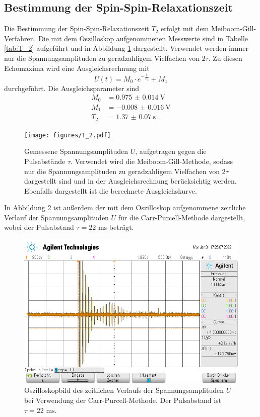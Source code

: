 \subsection*{Bestimmung der Spin-Spin-Relaxationszeit}
Die Bestimmung der Spin-Spin-Relaxationszeit $T_2$ erfolgt mit dem Meiboom-Gill-Verfahren. Die 
mit dem Oszilloskop aufgenommenen Messwerte sind in Tabelle \ref{tab:T_2} aufgeführt und in Abbildung
\ref{fig:T_2} dargestellt. Verwendet werden immer nur die Spannungsamplituden zu geradzahligem Vielfachen
von $2 \tau$. Zu diesen Echomaxima wird eine Ausgleichsrechnung mit 
\begin{equation*}
    U(t) = M_0 \cdot e^{-\frac{t}{T_2}} + M_1
\end{equation*}
durchgeführt. Die Ausgleichsparameter sind
\begin{align}
    M_0 &= \SI{0.975(14)}{\volt} \\
    M_1 &= \SI{-0.008(16)}{\volt} \\
    T_2 &= \SI{1.37(7)}{\second} \, .
    \label{eq:T_2}
\end{align}
\begin{figure}
    \centering
    \texttt{[image: figures/T\_2.pdf]}
    \caption{Gemessene Spannungsamplituden $U$, aufgetragen gegen die Pulsabstände $\tau$. Verwendet wird die 
            Meiboom-Gill-Methode, sodass nur die Spannungsamplituden zu geradzahligem Vielfachen
            von $2 \tau$ dargestellt sind und in der Ausgleichsrechnung berücksichtig werden. Ebenfalls dargestellt
            ist die berechnete Ausgleichskurve.}
    \label{fig:T_2}
\end{figure}
In Abbildung \ref{fig:Carr_Purcell} ist außerdem der mit dem Oszilloskop aufgenommene zeitliche Verlauf der 
Spannungsamplituden $U$ für die Carr-Purcell-Methode dargestellt, wobei der Pulsabstand $\tau = 22 \text{ ms}$
beträgt.
\begin{figure}
    \centering
    \includegraphics[width=\linewidth]{Messwerte/Carr_Purcell.png}
    \caption{Oszilloskopbild des zeitlichen Verlaufs der Spannungsamplituden $U$ bei Verwendung der 
            Carr-Purcell-Methode. Der Pulsabstand ist $\tau = 22 \text{ ms}.$}
    \label{fig:Carr_Purcell}
\end{figure}

